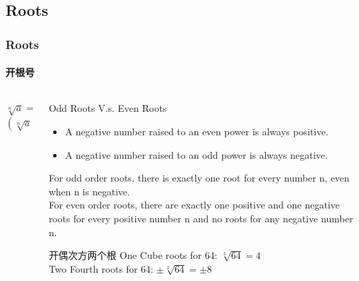 \documentclass[
	11pt, %
	handout,
]{beamer}
\begin{document}
\subsection{Roots}
\begin{frame}
\frametitle{Roots}
\framesubtitle{开根号}

	\begin{columns}[c] %

		\begin{column}{0.3\textwidth} %
		\begin{equation*}
			\sqrt[n]{a} = a^{\frac{1}{n}}
		\end{equation*}
		\bigskip
		\begin{equation*}
			(\sqrt[n]{a})^n = a
		\end{equation*}
		\end{column}

				\begin{column}{0.7\textwidth} %
					\begin{alertblock}{Odd Roots V.s. Even Roots}
					\begin{itemize}
							\item A negative number raised to an even power is always positive.
							\item A negative number raised to an odd power is always negative. 
					\end{itemize}
					For odd order roots, there is exactly one root for every number n, even when n is negative. \\
					For even order roots, there are exactly one positive and one negative roots for every positive number n and \alert{no roots for any negative number n}.
				 \end{alertblock}

					\begin{exampleblock}{开偶次方两个根}
						One Cube roots for 64: $\sqrt[3]{64} = 4$ \\
						Two Fourth roots for 64: $\pm \sqrt[2]{64} = \pm 8$
					\end{exampleblock}

		\end{column}
	\end{columns}
	
\end{frame}
\end{document}
